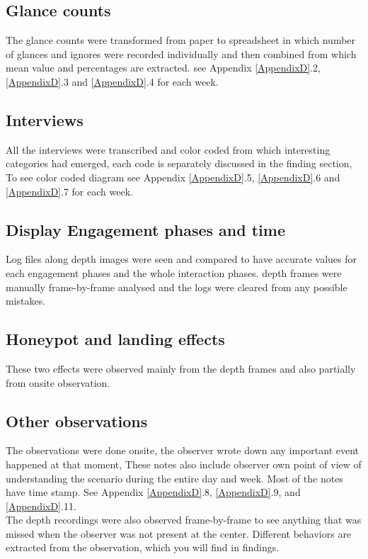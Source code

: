  
\subsection {Glance counts} 
The glance counts were transformed from paper to spreadsheet in which number of glances and ignores were recorded individually and then combined from which mean value and percentages are extracted. see Appendix \ref{AppendixD}.2, \ref{AppendixD}.3 and \ref{AppendixD}.4 for each week.

\subsection {Interviews} 
All the interviews were transcribed and color coded from which interesting categories had emerged, each code is separately discussed in the finding section, To see color coded diagram see Appendix \ref{AppendixD}.5, \ref{AppendixD}.6 and \ref{AppendixD}.7 for each week. 


\subsection {Display Engagement phases and time} 
Log files along depth images were seen and compared to have accurate values for each engagement phases and the whole interaction phases. depth frames were manually frame-by-frame analysed and the logs were cleared from any possible mistakes.

\subsection {Honeypot and landing effects}
These two effects were observed mainly from the depth frames and also partially from onsite observation.

\subsection {Other observations}
The observations were done onsite, the observer wrote down any important event happened at that moment, These notes also include observer own point of view of understanding the scenario during the entire day and week. Most of the notes have time stamp. See Appendix \ref{AppendixD}.8, \ref{AppendixD}.9, and \ref{AppendixD}.11.\\
The depth recordings were also observed frame-by-frame to see anything that was missed when the observer was not present at the center. Different behaviors are extracted from the observation, which you will find in findings.



